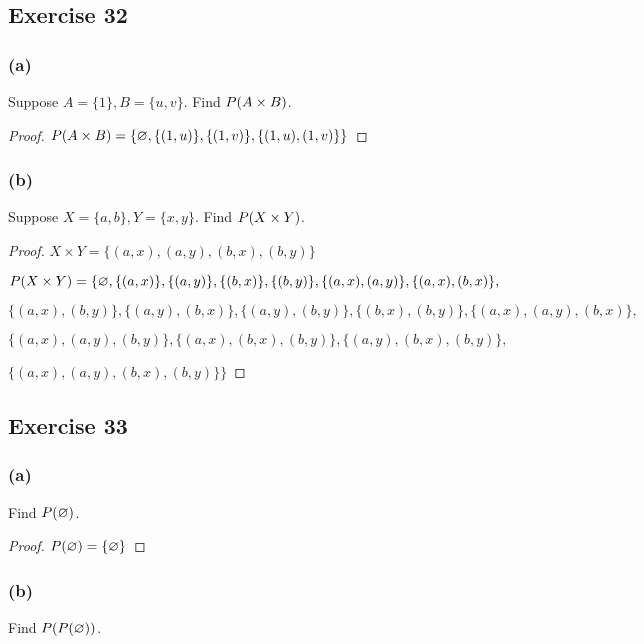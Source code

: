 \documentclass[14pt]{extarticle}
\let\mathscr\relax
\newcommand{\ps}{\mathscr{P}}
\newcommand{\es}{\varnothing}
\begin{document}
\subsection{Exercise 32}

\subsubsection{(a)}
Suppose \(A = \{1\}, B = \{u, v\}\). Find \(\ps(A \times B)\).

\begin{proof}
  \(\ps(A \times B) = \{\es, \{(1, u)\}, \{(1, v)\}, \{(1, u), (1, v)\}\}\)
\end{proof}

\subsubsection{(b)}
Suppose \(X = \{a, b\}, Y = \{x, y\}\). Find \(\ps(X \times Y)\).

\begin{proof}
  \(X \times Y = \{(a, x), (a, y), (b, x), (b, y)\}\)

  \(\ps(X \times Y) = \{\es, \{(a, x)\}, \{(a, y)\}, \{(b, x)\}, \{(b, y)\}, \{(a, x), (a, y)\}, \{(a, x), (b, x)\},\)

  \(\{(a, x), (b, y)\}, \{(a, y), (b, x)\}, \{(a, y), (b, y)\}, \{(b, x), (b, y)\}, \{(a, x), (a, y), (b, x)\},\)

  \(\{(a, x), (a, y), (b, y)\}, \{(a, x), (b, x), (b, y)\}, \{(a, y), (b, x), (b, y)\},\)

  \(\{(a, x), (a, y), (b, x), (b, y)\}\}\)
\end{proof}

\subsection{Exercise 33}

\subsubsection{(a)}
Find \(\ps(\es)\).

\begin{proof}
  \(\ps(\es) = \{\es\}\)
\end{proof}

\subsubsection{(b)}
Find \(\ps(\ps(\es))\).
\end{document}
